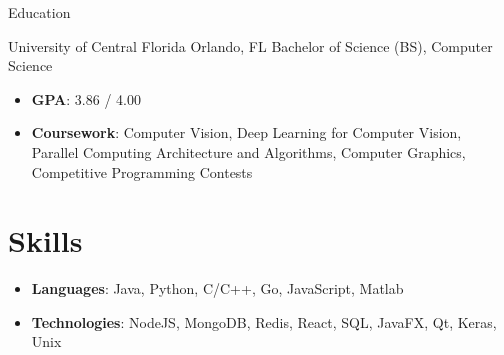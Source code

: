 \documentclass{resume}
\begin{document}
  \begin{fieldlist}{Education}

      {University of Central Florida}
      {Orlando, FL}
      {Bachelor of Science (BS), Computer Science}
      {
        \begin{itemize}
          \setlength\itemsep{0em}
          \item \textbf{GPA}: 3.86 / 4.00
          \item \textbf{Coursework}: Computer Vision, Deep Learning for Computer Vision, Parallel Computing Architecture and Algorithms, Computer Graphics, Competitive Programming Contests
        \end{itemize}
        
      }

  \end{fieldlist}
  \section{Skills}
      \begin{itemize}
        \item \textbf{Languages}: Java, Python, C/C++, Go, JavaScript, Matlab
        \item \textbf{Technologies}: NodeJS, MongoDB, Redis, React, SQL, JavaFX, Qt, Keras, Unix
      \end{itemize}
\end{document}
